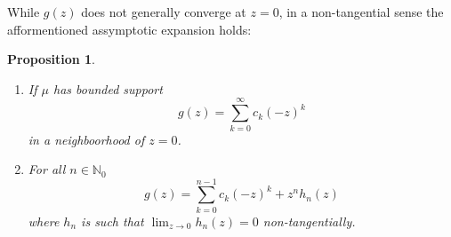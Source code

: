 \documentclass{amsart}
\newtheorem{proposition}[theorem]{Proposition}
\theoremstyle{remark}
\numberwithin{equation}{section}
\newcommand{\NN}{\mathbb{N}}
\begin{document}
While $g(z)$ does not generally converge at $z = 0$, in a non-tangential sense the afformentioned assymptotic expansion holds:
\begin{proposition}
\begin{enumerate}
\item If $\mu$ has bounded support
\[
    g(z) = \sum_{k = 0}^\infty c_k{(-z)}^k
\]
in a neighboorhood of $z=0$.
\item For all $n \in \NN_0$
\begin{equation}
    g(z) = \sum_{k = 0}^{n-1} c_k{(-z)}^k + z^n h_n(z) \label{assexp}
\end{equation}
where $h_n$ is such that $\lim_{z \rightarrow 0} h_n(z) = 0$ non-tangentially.
\end{enumerate}
\end{proposition}
\end{document}
